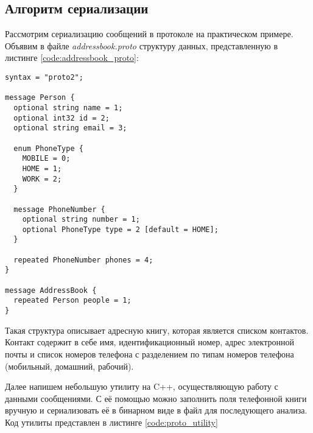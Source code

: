 \subsection{Алгоритм сериализации}

Рассмотрим сериализацию сообщений в протоколе на практическом примере. Объявим в файле \textit{addressbook.proto} 
структуру данных, представленную в листинге \ref{code:addressbook_proto}:

\begin{lstlisting}[style=CodeListing, label=code:addressbook_proto, caption={Protobuf-сообщения AddressBook и Person}]
syntax = "proto2";

message Person {
  optional string name = 1;
  optional int32 id = 2;
  optional string email = 3;

  enum PhoneType {
    MOBILE = 0;
    HOME = 1;
    WORK = 2;
  }

  message PhoneNumber {
    optional string number = 1;
    optional PhoneType type = 2 [default = HOME];
  }

  repeated PhoneNumber phones = 4;
}

message AddressBook {
  repeated Person people = 1;
}
\end{lstlisting}

Такая структура описывает адресную книгу, которая является списком контактов.
Контакт содержит в себе имя, идентификационный номер, адрес электронной почты и список номеров
телефона с разделением по типам номеров телефона (мобильный, домашний, рабочий).

Далее напишем небольшую утилиту на C++, осуществляющую работу с данными сообщениями. С её помощью можно заполнить поля телефонной книги вручную и сериализовать её в бинарном виде в файл для последующего анализа. Код утилиты представлен в листинге \ref{code:proto_utility}

